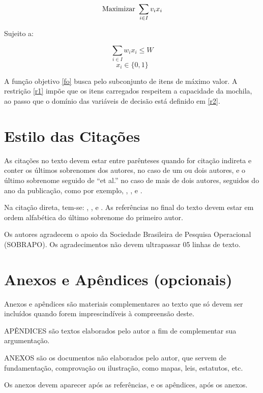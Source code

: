 \documentclass[a4paper,11pt,fleqn]{article}
\begin{document}
\begin{equation}
\label{fo}
\textnormal{Maximizar} ~\sum_{i \in I} v_i x_i
\end{equation}

Sujeito a:


\begin{equation}
\label{r1}
\sum_{i \in I} w_i x_i \leq W
\end{equation}
%
\begin{equation}
\label{r2}
x_i \in \{0, 1\}
\end{equation}

A função objetivo \eqref{fo} busca pelo subconjunto de itens de máximo valor. A restrição \eqref{r1} impõe que os itens carregados respeitem a capacidade da mochila, ao passo que o domínio das variáveis de decisão está definido em \eqref{r2}.


\section{Estilo das Citações}

As citações no texto devem estar entre parênteses quando for citação indireta e conter os últimos sobrenomes dos autores, no caso de um ou dois autores, e o último sobrenome seguido de ``et al.'' no caso de mais de dois autores, seguidos do ano da publicação, como por exemplo, \citep{ana12}, \citep{Gates2003,Feroz2007}, \citep{Pele2004} e \citep{Silva1999}.

Na citação direta, tem-se: \citet{Doe2012}, \citet{Fantucci2001}, \citet{Silva1999} e \citet{Smith2002}.
As referências no final do texto devem estar em ordem alfabética do último sobrenome do primeiro autor. 


\begin{agradecimentos}
Os autores agradecem o apoio da Sociedade Brasileira de Pesquisa Operacional (SOBRAPO). Os agradecimentos não devem ultrapassar 05 linhas de texto. 
\end{agradecimentos}


 



\section*{Anexos e Apêndices (opcionais)}

Anexos e apêndices são materiais complementares ao texto que só devem ser incluídos quando forem imprescindíveis à compreensão deste.

APÊNDICES são textos elaborados pelo autor a fim de complementar sua argumentação.

ANEXOS são os documentos não elaborados pelo autor, que servem de fundamentação, comprovação ou ilustração, como mapas, leis, estatutos, etc.

Os anexos devem aparecer após as referências, e os apêndices, após os anexos.
\end{document}
